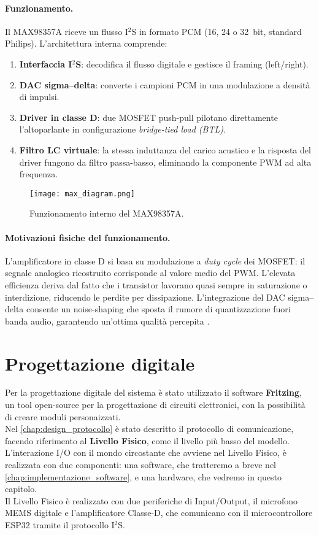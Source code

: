 \paragraph{Funzionamento.}
Il MAX98357A riceve un flusso I$^2$S in formato PCM (\SI{16}{}, \SI{24}{} o \SI{32}{bit}, standard Philips). L’architettura interna comprende:
\begin{enumerate}
  \item \textbf{Interfaccia I$^2$S}: decodifica il flusso digitale e gestisce il framing (left/right).
  \item \textbf{DAC sigma–delta}: converte i campioni PCM in una modulazione a densità di impulsi.
  \item \textbf{Driver in classe D}: due MOSFET push-pull pilotano direttamente l’altoparlante in configurazione \emph{bridge-tied load (BTL)}.
  \item \textbf{Filtro LC virtuale}: la stessa induttanza del carico acustico e la risposta del driver fungono da filtro passa-basso, eliminando la componente PWM ad alta frequenza.
\end{enumerate}
\begin{figure}[H]
  \centering
  \texttt{[image: max\_diagram.png]}
  \caption{Funzionamento interno del MAX98357A.}
  \label{fig:max_diagram}
  \end{figure}
\paragraph{Motivazioni fisiche del funzionamento.}
L’amplificatore in classe D si basa su modulazione a \emph{duty cycle} dei MOSFET: il segnale analogico ricostruito corrisponde al valore medio del PWM. L’elevata efficienza deriva dal fatto che i transistor lavorano quasi sempre in saturazione o interdizione, riducendo le perdite per dissipazione. L’integrazione del DAC sigma–delta consente un noise-shaping che sposta il rumore di quantizzazione fuori banda audio, garantendo un’ottima qualità percepita \citep{texas-classd}.

\section{Progettazione digitale}
Per la progettazione digitale del sistema è stato utilizzato il software \textbf{Fritzing}, un tool open-source
per la progettazione di circuiti elettronici, con la possibilità di creare moduli personaizzati.\\
Nel \autoref{chap:design_protocollo} è stato descritto il protocollo di comunicazione, facendo riferimento al \textbf{Livello Fisico},
come il livello più basso del modello. L'interazione I/O con il mondo circostante che avviene nel Livello Fisico, è realizzata con due componenti: una software, 
che tratteremo a breve nel \autoref{chap:implementazione_software}, e una hardware, che vedremo in questo capitolo.\\
Il Livello Fisico è realizzato con due periferiche di Input/Output, il microfono MEMS digitale e l'amplificatore Classe-D, che comunicano con il microcontrollore ESP32
 tramite il protocollo I$^2$S.\\

